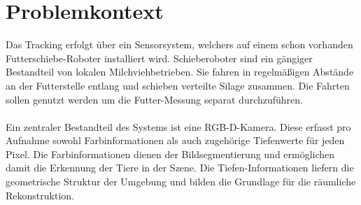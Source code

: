 \documentclass[12pt,DIV=15,BCOR=15mm,twoside,headsepline,abstract=true,listof=totoc,bibliography=totoc]{scrreprt}
\theoremstyle{remark}    %
\begin{document}
    \section{Problemkontext} \label{sec:problem}
    Das Tracking erfolgt über ein Sensorsystem, welchers auf einem schon vorhanden Futterschiebe-Roboter installiert wird. Schieberoboter sind ein 
    gängiger Bestandteil von lokalen Milchviehbetrieben. Sie fahren in regelmäßigen Abstände an der Futterstelle entlang und schieben verteilte Silage 
    zusammen. Die Fahrten sollen genutzt werden um die Futter-Messung separat durchzuführen.\\\\
    Ein zentraler Bestandteil des Systems ist eine \ac{RGB-D}-Kamera.
    Diese erfasst pro Aufnahme sowohl Farbinformationen als auch zugehörige Tiefenwerte für jeden Pixel.
    Die Farbinformationen dienen der Bildsegmentierung und ermöglichen damit die Erkennung der Tiere in der Szene.
    Die Tiefen-Informationen liefern die geometrische Struktur der Umgebung und bilden die Grundlage für die räumliche Rekonstruktion.
\end{document}
